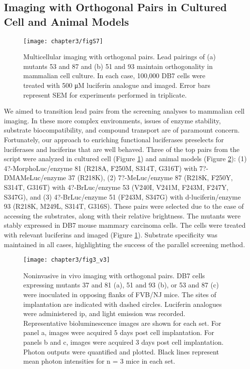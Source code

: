 \subsection*{Imaging with Orthogonal Pairs in Cultured Cell and Animal Models}
\begin{figure}[htbp]
\texttt{[image: chapter3/figS7]}
\centering
\caption[Multicellular imaging with orthogonal pairs]{Multicellular imaging with orthogonal pairs. Lead pairings of (a) mutants 53 and 87 and (b) 51 and 93 maintain orthogonality in mammalian cell culture. In each case, 100,000 DB7 cells were treated with 500 μM luciferin analogue and imaged. Error bars represent SEM for experiments performed in triplicate.}
  \label{fig:S7}
\end{figure}
We aimed to transition lead pairs from the screening analyses to mammalian cell imaging. In these more complex environments, issues of enzyme stability, substrate biocompatibility, and compound transport are of paramount concern. Fortunately, our approach to enriching functional luciferases preselects for luciferases and luciferins that are well behaved. Three of the top pairs from the script were analyzed in cultured cell (Figure \ref{fig:S7})
and animal models (Figure \ref{fig:inVivo}): (1) 4?-MorphoLuc/enzyme 81 (R218A, F250M, S314T, G316T) with 7?-DMAMeLuc/enzyme 37 (R218K), (2) 7?-MeLuc/enzyme 87 (R218K, F250Y, S314T, G316T) with 4?-BrLuc/enzyme 53 (V240I, V241M, F243M, F247Y, S347G), and (3) 4?-BrLuc/enzyme 51 (F243M, S347G) with d-luciferin/enzyme 93 (R218K, M249L, S314T, G316S). These pairs were selected due to the ease of accessing the substrates, along with their relative brightness. The mutants were stably expressed in DB7 mouse mammary carcinoma cells. The cells were treated with relevant luciferins and imaged (Figure \ref{fig:S7}). Substrate specificity was maintained in all cases, highlighting the success of the parallel screening method.
\par
\begin{figure}[htbp]
\texttt{[image: chapter3/fig3\_v3]}
\centering
\caption[Noninvasive in vivo imaging with orthogonal pairs]{Noninvasive in vivo imaging with orthogonal pairs. DB7 cells expressing mutants 37 and 81 (a), 51 and 93 (b), or 53 and 87 (c) were inoculated in opposing flanks of FVB/NJ mice. The sites of implantation are indicated with dashed circles. Luciferin analogues were administered ip, and light emission was recorded. Representative bioluminescence images are shown for each set. For panel a, images were acquired 5 days post cell implantation. For panels b and c, images were acquired 3 days post cell implantation. Photon outputs were quantified and plotted. Black lines represent mean photon intensities for n = 3 mice in each set.}
  \label{fig:inVivo}
\end{figure}
